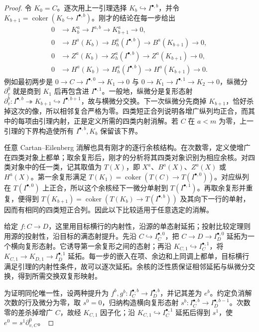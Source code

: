 \begin{proof}
	令 \(K_0=C\)。逐次用上一引理选择 \(K_b\hookrightarrow I^{\bullet,b}\)，并令 \(K_{b+1}=\operatorname{coker}(K_b\hookrightarrow I^{\bullet,b})\)。刚才的结论在每一步给出
	\[
		\begin{aligned}
			0&\longrightarrow K_b^a\longrightarrow I^{a,b} \longrightarrow K_{b+1}^a\longrightarrow0,\\
			0&\longrightarrow B^a(K_b)\longrightarrow B_h^a(I^{\bullet,b}) \longrightarrow B^a(K_{b+1})\longrightarrow0,\\
			0&\longrightarrow Z^a(K_b)\longrightarrow Z_h^a(I^{\bullet,b}) \longrightarrow Z^a(K_{b+1})\longrightarrow0,\\
			0&\longrightarrow H^a(K_b)\longrightarrow H_h^a(I^{\bullet,b}) \longrightarrow H^a(K_{b+1})\longrightarrow0.
		\end{aligned}
	\]
	例如最初两步是 \(0\to C\to I^{\bullet,0}\to K_1\to0\) 与 \(0\to K_1\to I^{\bullet,1}\to K_2\to0\)，纵微分 \(\partial_v^0\) 就是商到 \(K_1\) 后再包含进 \(I^{\bullet,1}\)。一般地，纵微分是复形态射 \(\partial_v^b:I^{\bullet,b}\twoheadrightarrow K_{b+1}\hookrightarrow I^{\bullet,b+1}\)，故与横微分交换。下一次纵微分先商掉 \(K_{b+1}\)，恰好杀掉这次的像，所以相邻复合严格为零。四类短正合列说明各增广纵列均正合，而其中的每项由引理内射，正是定义所需的四类内射消解。若 \(C\) 在 \(a<m\) 为零，上一引理的下界构造使所有 \(I^{\bullet,b},K_b\) 保留该下界。

	任意 Cartan--Eilenberg 消解也具有刚才的逐行余核结构。在次数零，定义使增广在四类对象上都单；取余复形后，刚才的分析将其四类对象识别为相应余核。对四类对象中的任一类，记其取值为 \(T(X)\)，即 \(X^a\)、\(B^a(X)\)、\(Z^a(X)\) 或 \(H^a(X)\)。第一余复形满足 \(T(K_1)=\operatorname{coker}(T(C)\to T(I^{\bullet,0}))\)。对应纵列在 \(T(I^{\bullet,0})\) 上正合，所以这个余核经下一微分单射到 \(T(I^{\bullet,1})\)。再取余复形并重复，便得到 \(T(K_{b+1})=\operatorname{coker}(T(K_b)\to T(I^{\bullet,b}))\) 及其向下一行的单射，因而有相同的四类短正合列。因此以下比较适用于任意选定的消解。

	给定 \(f:C\to D\)，这里用目标横行的内射性，沿源的单态射延拓；投射比较定理则用源的投射性，沿目标的满态射提升。先沿 \(C\hookrightarrow I_C^{\bullet,0}\)，把 \(C\to D\to I_D^{\bullet,0}\) 延拓为一个横向复形态射。它诱导第一余复形之间的态射；再沿 \(K_{C,1}\hookrightarrow I_C^{\bullet,1}\)，将 \(K_{C,1}\to K_{D,1}\to I_D^{\bullet,1}\) 延拓。每一步的嵌入在项、余边和上同调上都单，目标横行满足引理的内射性条件，故可以逐次延拓。余核的泛性质保证相邻延拓与纵微分交换，得到所需交换双复形映射。

	为证明同伦唯一性，设两种提升为 \(f^b,g^b:I_C^{\bullet,b}\to I_D^{\bullet,b}\)，并记其差为 \(e^b\)。约定负消解次数的行及微分为零，取 \(s^0=0\)，归纳构造横向复形态射 \(s^b:I_C^{\bullet,b}\to I_D^{\bullet,b-1}\)。次数零的差杀掉增广 \(C\)，故经 \(K_{C,1}\) 因子化；沿 \(K_{C,1}\hookrightarrow I_C^{\bullet,1}\) 延拓后得到 \(s^1\)，使 \(e^0=s^1\partial_{v,C}^0\)。


\end{proof}
